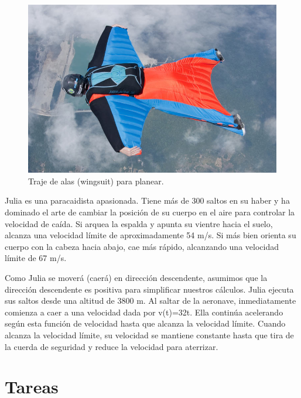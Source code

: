 \documentclass[
  a4paper,
]{scrreport}
\begin{document}
\begin{figure}[H]

{\centering \includegraphics{img/caida-libre/wingsuit.jpg}

}

\caption{Traje de alas (wingsuit) para planear.}

\end{figure}%

Julia es una paracaidista apasionada. Tiene más de 300 saltos en su
haber y ha dominado el arte de cambiar la posición de su cuerpo en el
aire para controlar la velocidad de caída. Si arquea la espalda y apunta
su vientre hacia el suelo, alcanza una velocidad límite de
aproximadamente 54 m/s. Si más bien orienta su cuerpo con la cabeza
hacia abajo, cae más rápido, alcanzando una velocidad límite de 67 m/s.

Como Julia se moverá (caerá) en dirección descendente, asumimos que la
dirección descendente es positiva para simplificar nuestros cálculos.
Julia ejecuta sus saltos desde una altitud de 3800 m. Al saltar de la
aeronave, inmediatamente comienza a caer a una velocidad dada por
v(t)=32t. Ella continúa acelerando según esta función de velocidad hasta
que alcanza la velocidad límite. Cuando alcanza la velocidad límite, su
velocidad se mantiene constante hasta que tira de la cuerda de seguridad
y reduce la velocidad para aterrizar.

\section{Tareas}\label{tareas-3}
\end{document}
